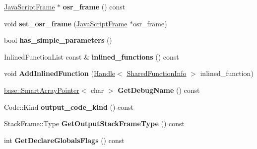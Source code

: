 \begin{DoxyCompactItemize}
\item 
\hyperlink{classv8_1_1internal_1_1_java_script_frame}{Java\+Script\+Frame} $\ast$ {\bfseries osr\+\_\+frame} () const \hypertarget{classv8_1_1internal_1_1_compilation_info_a150325949762f8f65cb934d7aaf6dba4}{}\label{classv8_1_1internal_1_1_compilation_info_a150325949762f8f65cb934d7aaf6dba4}

\item 
void {\bfseries set\+\_\+osr\+\_\+frame} (\hyperlink{classv8_1_1internal_1_1_java_script_frame}{Java\+Script\+Frame} $\ast$osr\+\_\+frame)\hypertarget{classv8_1_1internal_1_1_compilation_info_ac537641ae278187118831cbae9684916}{}\label{classv8_1_1internal_1_1_compilation_info_ac537641ae278187118831cbae9684916}

\item 
bool {\bfseries has\+\_\+simple\+\_\+parameters} ()\hypertarget{classv8_1_1internal_1_1_compilation_info_a72aa73d37e8904920615be40ab62eabd}{}\label{classv8_1_1internal_1_1_compilation_info_a72aa73d37e8904920615be40ab62eabd}

\item 
Inlined\+Function\+List const \& {\bfseries inlined\+\_\+functions} () const \hypertarget{classv8_1_1internal_1_1_compilation_info_acc1a0a3d825fd148a009a05c51b85b00}{}\label{classv8_1_1internal_1_1_compilation_info_acc1a0a3d825fd148a009a05c51b85b00}

\item 
void {\bfseries Add\+Inlined\+Function} (\hyperlink{classv8_1_1internal_1_1_handle}{Handle}$<$ \hyperlink{classv8_1_1internal_1_1_shared_function_info}{Shared\+Function\+Info} $>$ inlined\+\_\+function)\hypertarget{classv8_1_1internal_1_1_compilation_info_aac5ed4ad1f7b616f9138c9452065bc08}{}\label{classv8_1_1internal_1_1_compilation_info_aac5ed4ad1f7b616f9138c9452065bc08}

\item 
\hyperlink{classv8_1_1base_1_1_smart_array_pointer}{base\+::\+Smart\+Array\+Pointer}$<$ char $>$ {\bfseries Get\+Debug\+Name} () const \hypertarget{classv8_1_1internal_1_1_compilation_info_a222458910dcf7a29ceadde3bffd60014}{}\label{classv8_1_1internal_1_1_compilation_info_a222458910dcf7a29ceadde3bffd60014}

\item 
Code\+::\+Kind {\bfseries output\+\_\+code\+\_\+kind} () const \hypertarget{classv8_1_1internal_1_1_compilation_info_afd51a9e93ddcb9e074e99f79a9a7ce17}{}\label{classv8_1_1internal_1_1_compilation_info_afd51a9e93ddcb9e074e99f79a9a7ce17}

\item 
Stack\+Frame\+::\+Type {\bfseries Get\+Output\+Stack\+Frame\+Type} () const \hypertarget{classv8_1_1internal_1_1_compilation_info_a6a0ca12213da90419acab2541e976902}{}\label{classv8_1_1internal_1_1_compilation_info_a6a0ca12213da90419acab2541e976902}

\item 
int {\bfseries Get\+Declare\+Globals\+Flags} () const \hypertarget{classv8_1_1internal_1_1_compilation_info_aab85d84a6e83261fbbb524cd879fc862}{}\label{classv8_1_1internal_1_1_compilation_info_aab85d84a6e83261fbbb524cd879fc862}

\end{DoxyCompactItemize}
